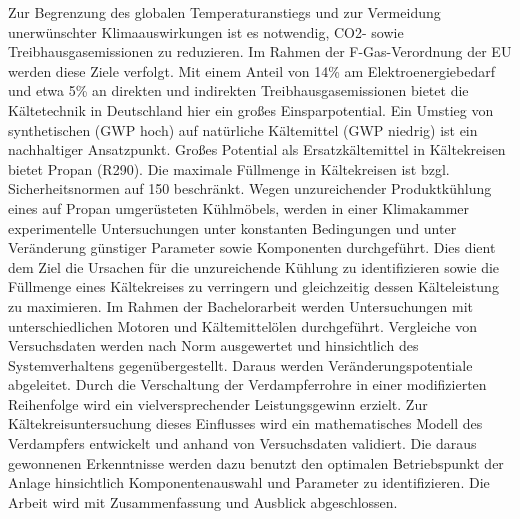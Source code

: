 Zur Begrenzung des globalen Temperaturanstiegs und zur Vermeidung unerwünschter Klimaauswirkungen ist es notwendig, CO2- sowie Treibhausgasemissionen zu reduzieren. Im Rahmen der F-Gas-Verordnung der EU werden diese Ziele verfolgt. Mit einem Anteil von \unit{14}{\%} am Elektroenergiebedarf und etwa \unit{5}{\%} an direkten und indirekten Treibhausgasemissionen bietet die Kältetechnik in Deutschland hier ein großes Einsparpotential. Ein Umstieg von synthetischen (GWP hoch) auf natürliche Kältemittel (GWP niedrig) ist ein nachhaltiger Ansatzpunkt. 
Großes Potential als Ersatzkältemittel in Kältekreisen bietet Propan (R290). Die maximale Füllmenge in Kältekreisen ist bzgl. Sicherheitsnormen auf \unit{150}{\gram} beschränkt. 
Wegen unzureichender Produktkühlung eines auf Propan umgerüsteten Kühlmöbels, werden in einer Klimakammer experimentelle Untersuchungen unter konstanten Bedingungen und unter Veränderung günstiger Parameter sowie Komponenten durchgeführt. Dies dient dem Ziel die Ursachen für die unzureichende Kühlung zu identifizieren sowie die Füllmenge eines Kältekreises zu verringern und gleichzeitig dessen Kälteleistung zu maximieren.
Im Rahmen der Bachelorarbeit werden Untersuchungen mit unterschiedlichen Motoren und Kältemittelölen durchgeführt. Vergleiche von Versuchsdaten werden nach Norm ausgewertet und hinsichtlich des Systemverhaltens gegenübergestellt. Daraus werden Veränderungspotentiale abgeleitet.
Durch die Verschaltung der Verdampferrohre in einer modifizierten Reihenfolge wird ein vielversprechender Leistungsgewinn erzielt. Zur Kältekreisuntersuchung dieses Einflusses wird ein mathematisches Modell des Verdampfers entwickelt und anhand von Versuchsdaten validiert.
Die daraus gewonnenen Erkenntnisse werden dazu benutzt den optimalen Betriebspunkt der Anlage hinsichtlich Komponentenauswahl und Parameter zu identifizieren.
Die Arbeit wird mit Zusammenfassung und Ausblick abgeschlossen.

